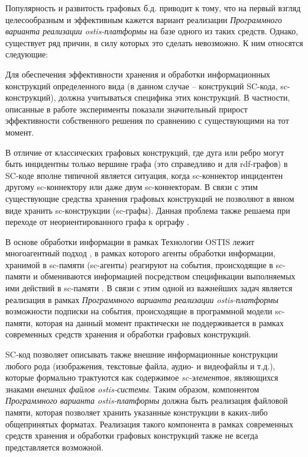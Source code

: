 Популярность и развитость графовых б.д. приводит к тому, что на первый взгляд целесообразным и эффективным кажется вариант реализации \textit{Программного варианта реализации ostis-платформы} на базе одного из таких средств. Однако, существует ряд причин, в силу которых это сделать невозможно. К ним относятся следующие:
\begin{textitemize}
    \item Для обеспечения эффективности хранения и обработки информационных конструкций определенного вида (в данном случае -- конструкций SC-кода, sc-конструкций), должна учитываться специфика этих конструкций. В частности, описанные в работе  эксперименты показали значительный прирост эффективности собственного решения по сравнению с существующими на тот момент.
    \item В отличие от классических графовых конструкций, где дуга или ребро могут быть инцидентны только вершине графа (это справедливо и для rdf-графов) в SC-коде вполне типичной является ситуация, когда sc-коннектор инцидентен другому sc-коннектору или даже двум sc-коннекторам. В связи с этим существующие средства хранения графовых конструкций не позволяют в явном виде хранить sc-конструкции (sc-графы). Данная проблема также решаема при переходе от неориентированного графа к орграфу .
    \item В основе обработки информации в рамках Технологии OSTIS лежит многоагентный подход \cite{iotti2018agent}, в рамках которого агенты обработки информации, хранимой в sc-памяти (sc-агенты) реагируют на события, происходящие в sc-памяти и обмениваются информацией посредством спецификации выполняемых ими действий в sc-памяти . В связи с этим одной из важнейших задач является реализация в рамках \textit{Программного варианта реализации ostis-платформы} возможности подписки на события, происходящие в программной модели sc-памяти, которая на данный момент практически не поддерживается в рамках современных средств хранения и обработки графовых конструкций.
    \item SC-код позволяет описывать также внешние информационные конструкции любого рода (изображения, текстовые файла, аудио- и видеофайлы и т.д.), которые формально трактуются как содержимое \textit{sc-элементов}, являющихся знаками \textit{внешних файлов ostis-системы}. Таким образом, компонентом \textit{Программного варианта ostis-платформы} должна быть реализация файловой памяти, которая позволяет хранить указанные конструкции в каких-либо общепринятых форматах. Реализация такого компонента в рамках современных средств хранения и обработки графовых конструкций также не всегда представляется возможной.
\end{textitemize}

